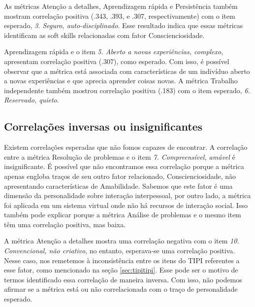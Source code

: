 As métricas Atenção a detalhes, Aprendizagem rápida e Persistência também mostram correlação positiva (.343, .393, e .307, respectivamente) com o item esperado, \textit{3. Seguro, auto-disciplinado}. Esse resultado indica que essas métricas identificam as soft skills relacionadas com fator Conscienciosidade.

Aprendizagem rápida e o item \textit{5. Aberto a novas experiências, complexo}, apresentam correlação positiva (.307), como esperado. Com isso, é possível observar que a métrica está associada com características de um indivíduo aberto a novas experiências e que aprecia aprender coisas novas. A métrica Trabalho independente também mostrou correlação positiva (.183) com o item esperado, \textit{6. Reservado, quieto}.

\subsection{Correlações inversas ou insignificantes}

Existem correlações esperadas que não fomos capazes de encontrar. A correlação entre a métrica Resolução de problemas e o item \textit{7. Compreensível, amável} é insignificante. É possível que não encontramos essa correlação porque a métrica apenas engloba traços de seu outro fator relacionado, Conscienciosidade, não apresentando características de Amabilidade. Sabemos que este fator é uma dimensão da personalidade sobre interação interpessoal, por outro lado, a métrica foi aplicada em um sistema virtual onde não há recursos de interação social. Isso também pode explicar porque a métrica Análise de problemas e o mesmo item têm uma correlação positiva, mas baixa.

A métrica Atenção a detalhes mostra uma correlação negativa com o item
\textit{10. Convencional, não criativo}, no entanto, esperava-se uma correlação positiva.
Nesse caso, nos remetemos à inconsistência entre os itens do TIPI referentes a esse fator, como mencionado na seção \ref{sec:tipitipi}.
Esse pode ser o motivo de termos identificado essa correlação de maneira inversa.
Com isso, não podemos afirmar se a métrica está ou não correlacionada com o traço de personalidade esperado.

